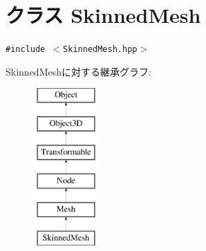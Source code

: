 \hypertarget{classm3g_1_1SkinnedMesh}{
\section{クラス SkinnedMesh}
\label{classm3g_1_1SkinnedMesh}
}
{\tt \#include $<$SkinnedMesh.hpp$>$}

SkinnedMeshに対する継承グラフ:\begin{figure}[H]
\begin{center}
\leavevmode
\includegraphics[height=6cm]{classm3g_1_1SkinnedMesh}
\end{center}
\end{figure}
